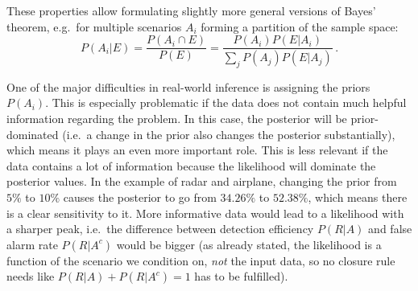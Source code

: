These properties allow formulating slightly more general versions of Bayes' theorem, e.g.~for multiple scenarios $A_i$ forming a partition of the sample space:
\begin{equation}\label{eq:bayes_events_general}
P(A_i | E) = \frac{P(A_i \cap E)}{P(E)} = \frac{P(A_i) P(E | A_i)}{\sum_j P(A_j) P(E | A_j)} \, .
\end{equation}

One of the major difficulties in real-world inference is assigning the priors $P(A_i)$. This is especially problematic if the data does not contain much helpful information regarding the problem. In this case, the posterior will be prior-dominated (i.e.~a change in the prior also changes the posterior substantially), which means it plays an even more important role. This is less relevant if the data contains a lot of information because the likelihood will dominate the posterior values. In the example of radar and airplane, changing the prior from $5\%$ to $10\%$ causes the posterior to go from $34.26\%$ to $52.38\%$, which means there is a clear sensitivity to it. More informative data would lead to a likelihood with a sharper peak, i.e.~the difference between detection efficiency $P(R | A)$ and false alarm rate $P(R | A^c)$ would be bigger (as already stated, the likelihood is a function of the scenario we condition on, \emph{not} the input data, so no closure rule needs like $P(R | A) + P(R | A^c) = 1$ has to be fulfilled).





